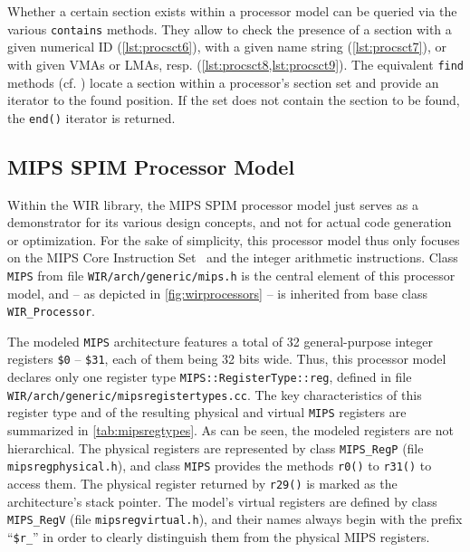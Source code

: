 Whether a certain section exists within a processor model can be queried via the various \texttt{contains} methods.
They allow to check the presence of a section with a given numerical ID (\cref{lst:procsct6}), with a given name string (\cref{lst:procsct7}), or with given \glspl{VMA} or \glspl{LMA}, resp. (\cref{lst:procsct8,lst:procsct9}).
The equivalent \texttt{find} methods (cf. ) locate a section within a processor's section set and provide an iterator to the found position.
If the set does not contain the section to be found, the \texttt{end()} iterator is returned.


\subsection{MIPS SPIM Processor Model}
\label{ssec:mipsmodel}

Within the \gls{WIR} library, the MIPS SPIM processor model just serves as a demonstrator for its various design concepts, and not for actual code generation or optimization.
For the sake of simplicity, this processor model thus only focuses on the MIPS Core Instruction Set~\cite{mips07} and the integer arithmetic instructions.
Class \texttt{MIPS} from file \texttt{WIR/arch/generic/mips.h} is the central element of this processor model, and -- as depicted in \cref{fig:wirprocessors} -- is inherited from base class \texttt{WIR\_Processor}.

The modeled \texttt{MIPS} architecture features a total of 32 general-purpose integer registers \texttt{\$0} -- \texttt{\$31}, each of them being 32 bits wide.
Thus, this processor model declares only one register type \texttt{MIPS::RegisterType::reg}, defined in file \texttt{WIR/arch/generic/mipsregistertypes.cc}.
The key characteristics of this register type and of the resulting physical and virtual \texttt{MIPS} registers are summarized in \cref{tab:mipsregtypes}.
As can be seen, the modeled registers are not hierarchical.
The physical registers are represented by class \texttt{MIPS\_RegP} (file \texttt{mipsregphysical.h}), and class \texttt{MIPS} provides the methods \texttt{r0()} to \texttt{r31()} to access them.
The physical register returned by \texttt{r29()} is marked as the architecture's stack pointer.
The model's virtual registers are defined by class \texttt{MIPS\_RegV} (file \texttt{mipsregvirtual.h}), and their names always begin with the prefix ``\texttt{\$r\_}'' in order to clearly distinguish them from the physical MIPS registers.

